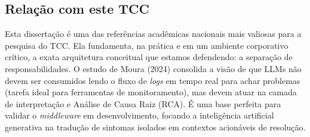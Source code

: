 \documentclass[12pt, a4paper]{article}
\begin{document}
\subsection*{Relação com este TCC}
Esta dissertação é uma das referências acadêmicas nacionais mais valiosas para a pesquisa do TCC. Ela fundamenta, na prática e em um ambiente corporativo crítico, a exata arquitetura conceitual que estamos defendendo: a separação de responsabilidades. O estudo de Moura (2024) consolida a visão de que LLMs não devem ser consumidos lendo o fluxo de \textit{logs} em tempo real para achar problemas (tarefa ideal para ferramentas de monitoramento), mas devem atuar na camada de interpretação e Análise de Causa Raiz (RCA). É uma base perfeita para validar o \textit{middleware} em desenvolvimento, focando a inteligência artificial generativa na tradução de sintomas isolados em contextos acionáveis de resolução.
\end{document}
